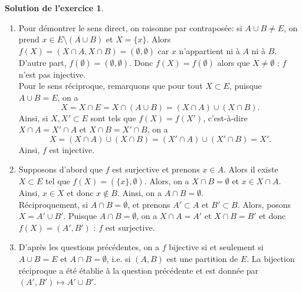 \documentclass[a4paper, 11pt,openany]{article}%
\theoremstyle{plain}
\theoremstyle{definition}
\newtheorem{sol}{Solution de l'exercice}
\theoremstyle{remark}
\begin{document}
\begin{sol}
\begin{enumerate}
\item Pour démontrer le sens direct, on raisonne par contraposée: si $A \cup B \neq E$, on prend $x \in E \setminus (A \cup B)$ et $X=\{x\}$. Alors $f(X)=(X \cap A,X \cap B)=( \emptyset , \emptyset)$ car $x$ n'appartient ni à $A$ ni à $B$. D'autre part, $f(\emptyset)=(\emptyset,\emptyset)$. Donc $f(X)=f(\emptyset)$ alors que $X \neq \emptyset$ : $f$ n'est pas injective.\\
Pour le sens réciproque, remarquons que pour tout $X \subset E$, puisque $A \cup B=E$, on a \[X=X \cap E=X \cap (A \cup B)=(X\cap A) \cup (X\cap B).\] Ainsi, si $X,X' \subset E$ sont tels que $f(X)=f(X')$, c'est-à-dire $X \cap A=X' \cap A$ et $X \cap B=X' \cap B$, on a 
\[ X=(X\cap A) \cup (X \cap B)=(X' \cap A) \cup (X' \cap B)=X'.\] Ainsi, $f$
est injective.
\item Supposons d'abord que $f$ est surjective et prenons $x \in A$. Alors il existe $X \subset E$ tel que $f(X)=(\{x\},\emptyset)$. Alors, on a $X \cap B= \emptyset$ et $x \in X \cap A$. Ainsi, $x \in X$ et donc $x \notin B$. Ainsi, on a $A \cap B= \emptyset$.\\
Réciproquement, si $A \cap B= \emptyset$, et prenons $A' \subset A$ et $B' \subset B$. Alors, posons $X=A' \cup B'$. Puisque $A \cap B= \emptyset$, on a $X \cap A=A'$ et $X \cap B=B'$ et donc $f(X)=(A',B')$ : $f$ est surjective.
\item D'après les questions précédentes, on a $f$ bijective si et seulement si $A \cup B=E$ et $A \cap B= \emptyset$, i.e. si $(A,B)$ est une partition de $E$. La bijection réciproque a été établie à la question précédente et est donnée par $(A',B') \mapsto A' \cup B'$.
\end{enumerate}
\end{sol}
\end{document}
